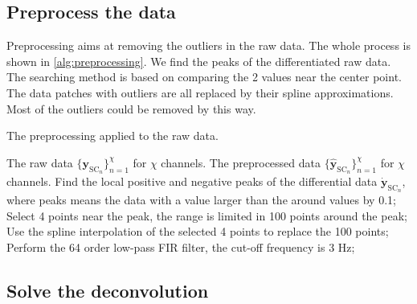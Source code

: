 \documentclass[]{article}
\begin{document}
\subsection{Preprocess the data}

Preprocessing aims at removing the outliers in the raw data. The whole process is shown in \autoref{alg:preprocessing}. We find the peaks of the differentiated raw data. The searching method is based on comparing the 2 values near the center point. The data patches with outliers are all replaced by their spline approximations. Most of the outliers could be removed by this way.
\begin{algorithm}[tb]
  \caption{The preprocessing applied to the raw data.}
  \label{alg:preprocessing}
  \begin{algorithmic}[1]
    \REQUIRE The raw data $\{\mathbf{y}_{\mathrm{SC}_n}\}_{n=1}^\chi$ for $\chi$ channels.
    \ENSURE The preprocessed data $\{\hat{\mathbf{y}}_{\mathrm{SC}_n}\}_{n=1}^\chi$ for $\chi$ channels.
      \STATE Find the local positive and negative peaks of the differential data $\dot{\mathbf{y}}_{\mathrm{SC}_n}$, where peaks means the data with a value larger than the around values by 0.1;
        \STATE Select 4 points near the peak, the range is limited in 100 points around the peak;
        \STATE Use the spline interpolation of the selected 4 points to replace the 100 points;
      \ENDFOR
      \STATE Perform the 64 order low-pass FIR filter, the cut-off frequency is 3 Hz;
    \ENDFOR
  \end{algorithmic}
\end{algorithm}

\subsection{Solve the deconvolution}



\end{document}

